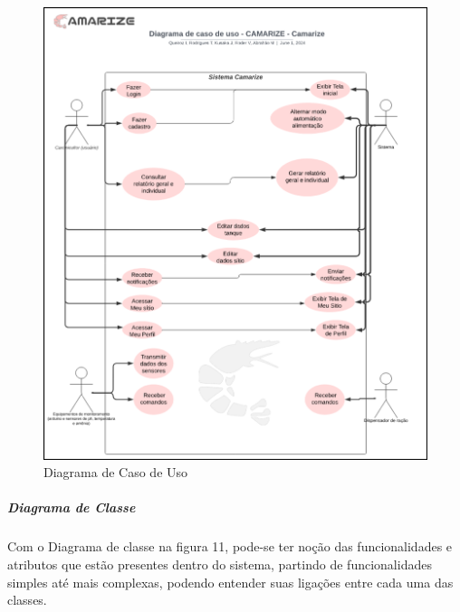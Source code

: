 \begin{figure}[!htb]
\centering
{}%
\caption{Diagrama de Caso de Uso}%
\label{fig:caso-uso}
\includegraphics[width = 1.3\CaptionWidth]{Imagem/Caso de Uso.png}
\end{figure}

\newpage

\subparagraph*{\textbf{Diagrama de Classe}}

Com o Diagrama de classe na figura 11, pode-se ter noção das funcionalidades e atributos que estão presentes dentro do sistema, partindo de funcionalidades simples até mais complexas, podendo entender suas ligações entre cada uma das classes.    

